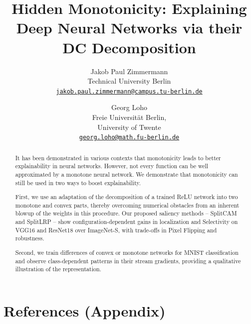 \documentclass[10pt,twocolumn,letterpaper]{article}
\title{Hidden Monotonicity: Explaining Deep Neural Networks via their DC Decomposition}
\author{Jakob Paul Zimmermann\\
Technical University Berlin\\
{\tt\small \href{mailto:jakob.paul.zimmermann@campus.tu-berlin.de}{jakob.paul.zimmermann@campus.tu-berlin.de}}
\and
Georg Loho\\
Freie Universit\"at Berlin,\\University of Twente\\
{\tt\small \href{mailto:georg.loho@math.fu-berlin.de}{georg.loho@math.fu-berlin.de}}
}
\begin{document}
\maketitle
\begin{abstract}
  It has been demonstrated in various contexts that monotonicity leads to better explainability in neural networks.
  However, not every function can be well approximated by a monotone neural network.
  We demonstrate that monotonicity can still be used in two ways to boost explainability.

  First, we use an adaptation of the decomposition of a trained ReLU network into two monotone and convex parts, thereby overcoming numerical obstacles from an inherent blowup of the weights in this procedure.
  Our proposed saliency methods -- SplitCAM and SplitLRP -- show configuration-dependent gains in localization and Selectivity on VGG16 and ResNet18 over ImageNet-S, with trade-offs in Pixel Flipping and robustness.

  Second, we train differences of convex or monotone networks for MNIST classification and observe class-dependent patterns in their stream gradients, providing a qualitative illustration of the representation.
\end{abstract}











\nocite{Amos2017}
\nocite{Brandenburg2024b}
\nocite{Haase2023}
\nocite{Arora2018}
\nocite{Sankaranarayanan2021CDINN}
\nocite{Zhang2018}
\nocite{Ziegler1995}




\clearpage
\onecolumn
\setlength{\columnwidth}{\textwidth}
\setlength{\linewidth}{\textwidth}

\appendix \label{app}


\clearpage

\clearpage

\clearpage

\clearpage

\clearpage


\section*{References (Appendix)}
\end{document}
